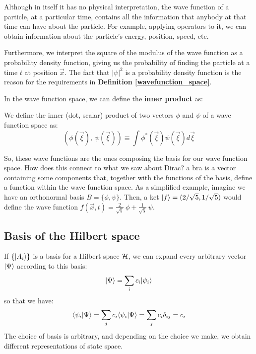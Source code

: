 Although in itself it has no physical interpretation, the wave function of a particle, at a particular time, contains all the information that anybody at that time can have about the particle. For example, applying operators to it, we can obtain information about the particle's energy, position, speed, etc.

Furthermore, we interpret the square of the modulus of the wave function as a probability density function, giving us the probability of finding the particle at a time $t$ at position $\vec{x}$. The fact that $|\psi|^2$ is a probability density function is the reason for the requirements in \textbf{Definition \ref{wavefunction_space}}. 

In the wave function space, we can define the \textbf{inner product} as:

\begin{definition}
    We define the inner (dot, scalar) product of two vectors $\phi$ and $\psi$ of a wave function space as:
    \begin{equation}
        \left(\phi(\vec{\xi}), \ \psi(\vec{\xi})\right) \equiv \int\phi^*(\vec{\xi})\psi(\vec{\xi})d\vec{\xi}
    \end{equation}
\end{definition}

So, these wave functions are the ones composing the basis for our wave function space. How does this connect to what we saw about Dirac? a bra is a vector containing some components that, together with the functions of the basis, define a function within the wave function space. As a simplified example, imagine we have an orthonormal basis $B = \{\phi, \psi\}$. Then, a ket $|f\rangle = (2/\sqrt{5}, 1/\sqrt{5})$ would define the wave function $f(\vec{x}, t) = \frac{2}{\sqrt5}\ \phi + \frac{1}{\sqrt5}\ \psi$.












\subsection{Basis of the Hilbert space}

If $\{|A_i\rangle\}$ is a basis for a Hilbert space $\mathcal{H}$, we can expand every arbitrary vector $|\Psi\rangle$ according to this basis:
\begin{equation}
    |\Psi\rangle = \sum_i c_i |\psi_i\rangle
\end{equation}
so that we have:
\begin{equation}
    \langle\psi_i|\Psi\rangle = \sum_j c_i \langle\psi_i|\Psi\rangle = \sum_j c_i\delta_{ij} = c_i
\end{equation}
The choice of basis is arbitrary, and depending on the choice we make, we obtain different representations of state space. 

